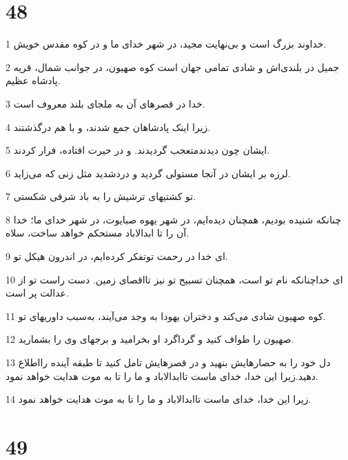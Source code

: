 \chapter{48}

\par 1 خداوند بزرگ است و بی‌نهایت مجید، در شهر خدای ما و در کوه مقدس خویش.
\par 2 جمیل در بلندی‌اش و شادی تمامی جهان است کوه صهیون، در جوانب شمال، قریه پادشاه عظیم.
\par 3 خدا در قصرهای آن به ملجای بلند معروف است.
\par 4 زیرا اینک پادشاهان جمع شدند، و با هم درگذشتند.
\par 5 ایشان چون دیدندمتعجب گردیدند. و در حیرت افتاده، فرار کردند.
\par 6 لرزه بر ایشان در آنجا مستولی گردید و دردشدید مثل زنی که می‌زاید.
\par 7 تو کشتیهای ترشیش را به باد شرقی شکستی.
\par 8 چنانکه شنیده بودیم، همچنان دیده‌ایم، در شهر یهوه صبایوت، در شهر خدای ما؛ خدا آن را تا ابدالاباد مستحکم خواهد ساخت، سلاه.
\par 9 ‌ای خدا در رحمت توتفکر کرده‌ایم، در اندرون هیکل تو.
\par 10 ‌ای خداچنانکه نام تو است، همچنان تسبیح تو نیز تااقصای زمین. دست راست تو از عدالت پر است.
\par 11 کوه صهیون شادی می‌کند و دختران یهودا به وجد می‌آیند، به‌سبب داوریهای تو.
\par 12 صهیون را طواف کنید و گرداگرد او بخرامید و برجهای وی را بشمارید.
\par 13 دل خود را به حصارهایش بنهید و در قصرهایش تامل کنید تا طبقه آینده رااطلاع دهید.زیرا این خدا، خدای ماست تاابدالاباد و ما را تا به موت هدایت خواهد نمود.
\par 14 زیرا این خدا، خدای ماست تاابدالاباد و ما را تا به موت هدایت خواهد نمود.
 
\chapter{49}

